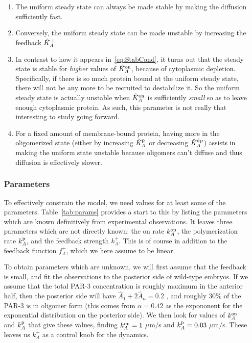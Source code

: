 \documentclass[11pt]{article}
\newcommand{\6}[1]{#1_{\text{6}}}
\newcommand{\3}[1]{#1_{\text{3}}}
\newcommand{\A}[1]{#1_A}
\begin{document}
\begin{enumerate}
\item The uniform steady state can always be made stable by making the diffusion sufficiently fast.
\item Conversely, the uniform steady state can be made unstable by increasing the feedback $\hat{K}^\text{+}_A$.
\item In contrast to how it appears in\ \eqref{eq:StabCond}, it turns out that the steady state is stable for \emph{higher} values of $ \hat{K}^\text{on}_A $, because of cytoplasmic depletion. Specifically, if there is so much protein bound at the uniform steady state, there will not be any more to be recruited to destabilize it. So the uniform steady state is actually unstable when $\hat{K}^\text{on}_A$ is sufficiently \emph{small} so as to leave enough cytoplasmic protein. As such, this parameter is not really that interesting to study going forward.
\item For a fixed amount of membrane-bound protein, having more in the oligomerized state (either by increasing $\hat{K}^\text{p}_A$ or decreasing $\hat{K}^\text{dp}_A$) assists in making the uniform state unstable because oligomers can't diffuse and thus diffusion is effectively slower.
\end{enumerate}



\subsubsection{Parameters}
To effectively constrain the model, we need values for at least some of the parameters. Table\ \ref{tab:params} provides a start to this by listing the parameters which are known definitively from experimental observations. It leaves three parameters which are not directly known: the on rate $\A{\kon}$, the polymerization rate $\A{\kp}$, and the feedback strength $k_A^+$. This is of course in addition to the feedback function $f_A^+$, which we here assume to be linear.

To obtain parameters which are unknown, we will first assume that the feedback is small, and fit the observations to the posterior side of wild-type embryos. If we assume that the total PAR-3 concentration is roughly maximum in the anterior half, then the posterior side will have $\hat A_1+2 \hat A_n=0.2$ \cite[Fig.~2]{lang2023oligomerization}, and roughly 30\% of the PAR-3 is in oligomer form \cite{lang2023oligomerization} (this comes from $\alpha=0.42$ as the expononent for the exponential distribution on the posterior side). We then look for values of $\A{\kon}$ and $\A{\kp}$ that give these values, finding $\A{\kon} = 1$ $\mu$m/s and $\A{\kp}=0.03$ $\mu$m/s. These leaves us $k_A^+$ as a control knob for the dynamics.
\end{document}
